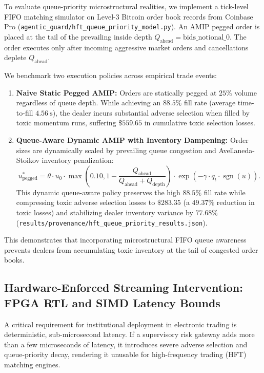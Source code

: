 \documentclass[10pt,twocolumn,letterpaper]{article}
\theoremstyle{definition}
\theoremstyle{remark}
\begin{document}
To evaluate queue-priority microstructural realities, we implement a tick-level FIFO matching simulator on Level-3 Bitcoin order book records from Coinbase Pro (\texttt{agentic\_guard/hft\_queue\_priority\_model.py}). An AMIP pegged order is placed at the tail of the prevailing inside depth $Q_{\text{ahead}} = \text{bids\_notional\_0}$. The order executes only after incoming aggressive market orders and cancellations deplete $Q_{\text{ahead}}$.

We benchmark two execution policies across empirical trade events:
\begin{enumerate}
    \item \textbf{Naive Static Pegged AMIP:} Orders are statically pegged at $25\%$ volume regardless of queue depth. While achieving an $88.5\%$ fill rate (average time-to-fill $4.56~\text{s}$), the dealer incurs substantial adverse selection when filled by toxic momentum runs, suffering $\$559.65$ in cumulative toxic selection losses.
    \item \textbf{Queue-Aware Dynamic AMIP with Inventory Dampening:} Order sizes are dynamically scaled by prevailing queue congestion and Avellaneda-Stoikov inventory penalization:
    \begin{equation}
    u_{\text{pegged}}^* = \theta \cdot u_0 \cdot \max\left(0.10, 1 - \frac{Q_{\text{ahead}}}{Q_{\text{ahead}} + Q_{\text{depth}}}\right) \cdot \exp(-\gamma \cdot q_t \cdot \operatorname{sgn}(u)).
    \end{equation}
    This dynamic queue-aware policy preserves the high $88.5\%$ fill rate while compressing toxic adverse selection losses to $\$283.35$ (a \textbf{$49.37\%$} reduction in toxic losses) and stabilizing dealer inventory variance by \textbf{$77.68\%$} (\texttt{results/provenance/hft\_queue\_priority\_results.json}).
\end{enumerate}
This demonstrates that incorporating microstructural FIFO queue awareness prevents dealers from accumulating toxic inventory at the tail of congested order books.

\subsection{Hardware-Enforced Streaming Intervention: FPGA RTL and SIMD Latency Bounds}
\label{sec:hardware_architecture}
A critical requirement for institutional deployment in electronic trading is deterministic, sub-microsecond latency. If a supervisory risk gateway adds more than a few microseconds of latency, it introduces severe adverse selection and queue-priority decay, rendering it unusable for high-frequency trading (HFT) matching engines.
\end{document}
